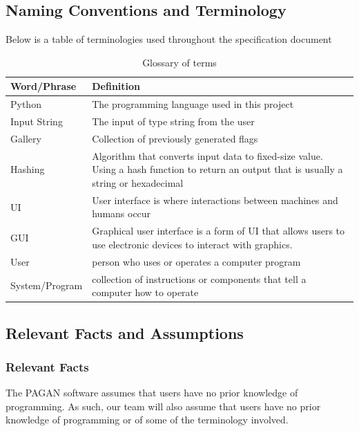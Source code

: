 \documentclass[12pt, titlepage]{article}
\begin{document}
\subsection{Naming Conventions and Terminology}

Below is a table of terminologies used throughout the specification document
\begin{table}[!h]
\caption{Glossary of terms}
\label{t}
\begin{tabular}{|l|p{13cm}|}
\hline
Word/Phrase & Definition                                                                             \\ \hline
Python  & The programming language used in this project                                  \\ \hline
Input String    & The input of type string from the user              \\ \hline
Gallery    & Collection of previously generated flags                                   \\ \hline
Hashing   & Algorithm that converts input data to fixed-size value. Using a hash function to return an output that is usually a string or hexadecimal                      \\ \hline
UI      & User interface is where interactions between machines and humans occur\\ \hline
GUI   & Graphical user interface is a form of UI that allows users to use electronic devices to interact with graphics.                    \\ \hline
User & person who uses or operates a computer program \\ \hline
System/Program & collection of instructions or components that tell a computer how to operate \\ \hline 
\end{tabular}
\end{table}

\subsection{Relevant Facts and Assumptions}
\subsubsection{Relevant Facts}

The PAGAN software assumes that users have no prior knowledge of programming. As such, our team will also assume that users have no prior knowledge of programming or of some of the terminology involved.
\end{document}
